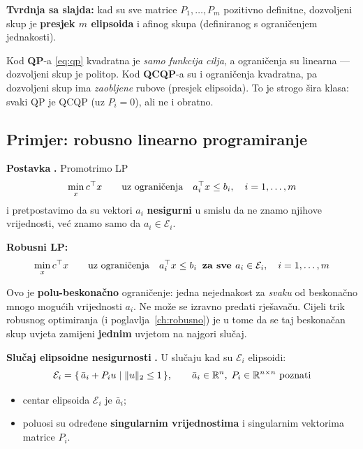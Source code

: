 \textbf{Tvrdnja sa slajda:} kad su sve matrice $P_1,\dots,P_m$ pozitivno
definitne, dozvoljeni skup je \textbf{presjek $m$ elipsoida} i afinog skupa
(definiranog s ograničenjem jednakosti).

\begin{napomena}
Kod \textbf{QP}-a \eqref{eq:qp} kvadratna je \emph{samo funkcija cilja}, a
ograničenja su linearna --- dozvoljeni skup je politop. Kod \textbf{QCQP}-a su
i ograničenja kvadratna, pa dozvoljeni skup ima \emph{zaobljene} rubove
(presjek elipsoida). To je strogo šira klasa: svaki QP je QCQP (uz
$P_i = 0$), ali ne i obratno.
\end{napomena}

\subsection{Primjer: robusno linearno programiranje}
\label{sec:robusni-lp-cqp}

\textbf{Postavka} \textbf{.} Promotrimo LP
\[
\min_x c\T x \qquad \uzogr a_i\T x \le b_i, \quad i = 1,\dots,m
\]
i pretpostavimo da su vektori $a_i$ \textbf{nesigurni} u smislu da ne znamo
njihove vrijednosti, već znamo samo da $a_i \in \mathcal{E}_i$.

\textbf{Robusni LP:}
\begin{equation}
\label{eq:robusni-lp}
\min_x c\T x \qquad \uzogr a_i\T x \le b_i \;\;\textbf{za sve } a_i \in \mathcal{E}_i,
\quad i = 1,\dots,m
\end{equation}

\begin{napomena}
Ovo je \textbf{polu-beskonačno} ograničenje: jedna nejednakost za \emph{svaku}
od beskonačno mnogo mogućih vrijednosti $a_i$. Ne može se izravno predati
rješavaču. Cijeli trik robusnog optimiranja (i poglavlja~\ref{ch:robusno}) je
u tome da se taj beskonačan skup uvjeta zamijeni \textbf{jednim} uvjetom na
najgori slučaj.
\end{napomena}

\textbf{Slučaj elipsoidne nesigurnosti} \textbf{.} U slučaju kad su
$\mathcal{E}_i$ elipsoidi:
\[
\mathcal{E}_i = \{\, \bar a_i + P_iu \mid \|u\|_2 \le 1 \,\},
\qquad \bar a_i \in \R^n,\; P_i \in \R^{n\times n} \text{ poznati}
\]
\begin{itemize}
  \item centar elipsoida $\mathcal{E}_i$ je $\bar a_i$;
  \item poluosi su određene \textbf{singularnim vrijednostima} i singularnim
        vektorima matrice $P_i$.
\end{itemize}

